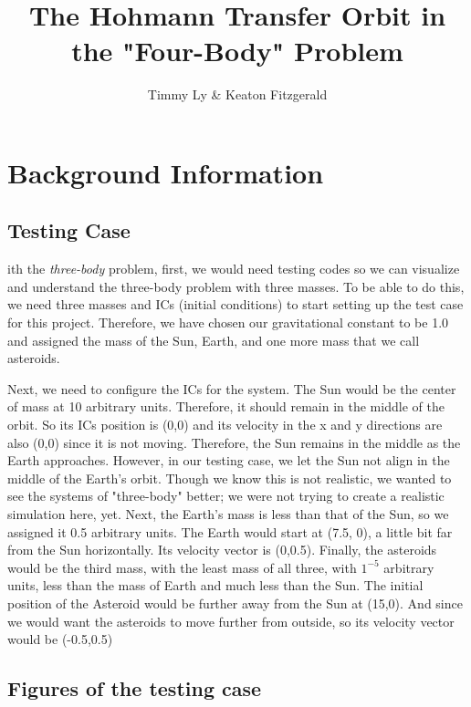 \documentclass[12pt,a4paper,twocolumn,twoside]{tau-class/tau}
\title{The Hohmann Transfer Orbit in the "Four-Body" Problem}
\author {Timmy Ly \& Keaton Fitzgerald}
\begin{document}
		
    \maketitle 
    \thispagestyle{firststyle} 
    \tauabstract 
\section{Background Information}
    \subsection{Testing Case}

    ith the \textit{three-body} problem, first, we would need testing codes so we can visualize and understand the three-body problem with three masses. To be able to do this, we need three masses and ICs (initial conditions) to start setting up the test case for this project. Therefore, we have chosen our gravitational constant to be 1.0 and assigned the mass of the Sun, Earth, and one more mass that we call asteroids.
	
    Next, we need to configure the ICs for the system. The Sun would be the center of mass at 10 arbitrary units. Therefore, it should remain in the middle of the orbit. So its ICs position is (0,0) and its velocity in the x and y directions are also (0,0) since it is not moving. Therefore, the Sun remains in the middle as the Earth approaches. However, in our testing case, we let the Sun not align in the middle of the Earth's orbit. Though we know this is not realistic, we wanted to see the systems of "three-body" better; we were not trying to create a realistic simulation here, yet.
    Next, the Earth's mass is less than that of the Sun, so we assigned it 0.5 arbitrary units. The Earth would start at (7.5, 0), a little bit far from the Sun horizontally. Its velocity vector is (0,0.5).
    Finally, the asteroids would be the third mass, with the least mass of all three, with $1^{-5}$ arbitrary units, less than the mass of Earth and much less than the Sun. The initial position of the Asteroid would be further away from the Sun at (15,0). And since we would want the asteroids to move further from outside, so its velocity vector would be (-0.5,0.5)

    \subsection{Figures of the testing case}
    
\end{document}
